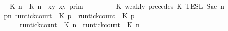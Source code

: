 \begin{isabellebody}
\isanewline
\ \ \ \ \ \ {\isasymlbrakk}\ {\isacharparenleft}{\isasymlceil}{\isacharhash}\isactrlsup {\isasymle}\ K\ n{\isacharcomma}\ {\isacharhash}\isactrlsup {\isasymle}\ K\ n{\isasymrceil}\ {\isasymin}\ {\isacharparenleft}{\isasymlambda}{\isacharparenleft}x{\isacharcomma}y{\isacharparenright}{\isachardot}\ x{\isasymle}y{\isacharparenright}{\isacharparenright}\ {\isasymrbrakk}\isactrlsub p\isactrlsub r\isactrlsub i\isactrlsub m\ \isanewline
\ \ \ \ \ \ {\isasyminter}\ {\isasymlbrakk}\ K\ weakly\ precedes\ K\ {\isasymrbrakk}\isactrlsub T\isactrlsub E\isactrlsub S\isactrlsub L\isactrlbsup {\isasymge}\ Suc\ n\isactrlesup {\isacartoucheclose}\isanewline
%
\isadelimproof
%
\endisadelimproof
%
\isatagproof
{}\isamarkupfalse%
\ {\isacharminus}\isanewline
\ \ \isamarkupfalse%
\ {\isacartoucheopen}{\isacharbraceleft}{\isasymrho}{\isachardot}\ {\isasymforall}p{\isasymge}n{\isachardot}\ {\isacharparenleft}run{\isacharunderscore}tick{\isacharunderscore}count\ {\isasymrho}\ K\ p{\isacharparenright}\ {\isasymle}\ {\isacharparenleft}run{\isacharunderscore}tick{\isacharunderscore}count\ {\isasymrho}\ K\ p{\isacharparenright}{\isacharbraceright}\isanewline
\ \ \ \ \ \ \ \ \ {\isacharequal}\ {\isacharbraceleft}{\isasymrho}{\isachardot}\ {\isacharparenleft}run{\isacharunderscore}tick{\isacharunderscore}count\ {\isasymrho}\ K\ n{\isacharparenright}\ {\isasymle}\ {\isacharparenleft}run{\isacharunderscore}tick{\isacharunderscore}count\ {\isasymrho}\ K\ n{\isacharparenright}{\isacharbraceright}\isanewline

\end{isabellebody}
